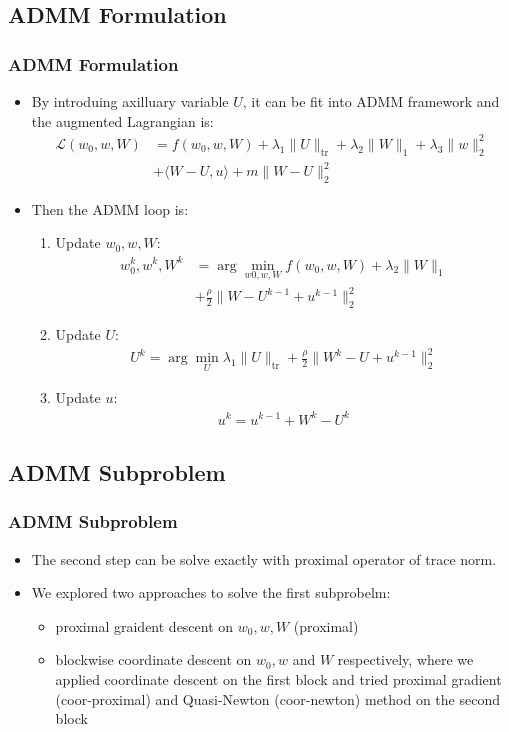 \documentclass{beamer}
\begin{document}
\subsection{ADMM Formulation}
\begin{frame}
\frametitle{ADMM Formulation}
\begin{itemize}
  \item By introduing axilluary variable $U$, it can be fit into ADMM framework and the augmented Lagrangian is:
    \begin{align*}
      \mathcal{L}(w_0, w, W) &= f(w_0, w, W) + \lambda_1 \|U\|_{\text{tr}} + \lambda_2 \|W\|_1 + \lambda_3 \|w\|_2^2 \\
      &+ \langle W - U, u \rangle + m\|W - U\|_2^2 
    \end{align*}
  \item Then the ADMM loop is:
    \begin{enumerate}
    \item Update $w_0, w, W$:
    \begin{align*}
        w_0^k, w^k, W^k &= \arg\min_{w0, w, W} f(w_0, w, W) + \lambda_2 \|W\|_1 \\
        &+ \frac{\rho}{2} \|W - U^{k - 1} + u^{k - 1}\|_2^2
    \end{align*}
    \item Update $U$:
    \begin{align*}
        U^k = \arg\min_U \lambda_1 \|U\|_{\text{tr}} + \frac{\rho}{2}\|W^k - U + u^{k-1}\|_2^2
    \end{align*}
    \item Update $u$:
    \begin{align*}
        u^k = u^{k - 1} + W^k - U^k
    \end{align*}
\end{enumerate}
\end{itemize}
\end{frame}

\subsection{ADMM Subproblem}
\begin{frame}
\frametitle{ADMM Subproblem}
\begin{itemize}
  \item The second step can be solve exactly with proximal operator of trace norm.
  \item We explored two approaches to solve the first subprobelm:
    \begin{itemize}
      \item proximal graident descent on $w_0, w, W$ (proximal)
      \item blockwise coordinate descent on $w_0, w$ and $W$ respectively, where we applied coordinate descent on the first block and tried proximal gradient (coor-proximal) and Quasi-Newton (coor-newton) method on the second block
    \end{itemize}
\end{itemize}
\end{frame}
\end{document}
